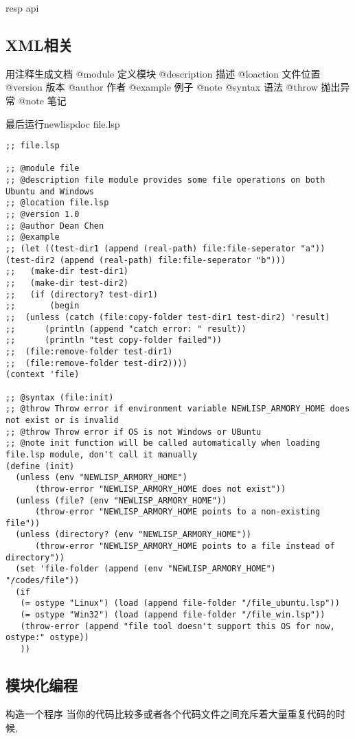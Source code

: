 \documentclass[cn,11pt]{elegantbook}
\begin{document}
resp api
 
\subsection{XML相关}

用注释生成文档
@module 定义模块
@description 描述
@loaction 文件位置
@version 版本
@author 作者
@example 例子
@note
@syntax 语法
@throw 抛出异常
@note 笔记

最后运行newlispdoc file.lsp
\begin{lstlisting}
;; file.lsp

;; @module file
;; @description file module provides some file operations on both Ubuntu and Windows
;; @location file.lsp
;; @version 1.0
;; @author Dean Chen
;; @example
;; (let ((test-dir1 (append (real-path) file:file-seperator "a")) (test-dir2 (append (real-path) file:file-seperator "b")))
;;   (make-dir test-dir1)
;;   (make-dir test-dir2)
;;   (if (directory? test-dir1)
;;       (begin
;; 	(unless (catch (file:copy-folder test-dir1 test-dir2) 'result)
;; 		(println (append "catch error: " result))
;; 		(println "test copy-folder failed"))
;; 	(file:remove-folder test-dir1)
;; 	(file:remove-folder test-dir2))))
(context 'file)

;; @syntax (file:init)
;; @throw Throw error if environment variable NEWLISP_ARMORY_HOME does not exist or is invalid
;; @throw Throw error if OS is not Windows or UBuntu
;; @note init function will be called automatically when loading file.lsp module, don't call it manually
(define (init)
  (unless (env "NEWLISP_ARMORY_HOME")
	  (throw-error "NEWLISP_ARMORY_HOME does not exist"))
  (unless (file? (env "NEWLISP_ARMORY_HOME"))
	  (throw-error "NEWLISP_ARMORY_HOME points to a non-existing file"))
  (unless (directory? (env "NEWLISP_ARMORY_HOME"))
	  (throw-error "NEWLISP_ARMORY_HOME points to a file instead of directory"))
  (set 'file-folder (append (env "NEWLISP_ARMORY_HOME") "/codes/file"))
  (if
   (= ostype "Linux") (load (append file-folder "/file_ubuntu.lsp"))
   (= ostype "Win32") (load (append file-folder "/file_win.lsp"))
   (throw-error (append "file tool doesn't support this OS for now, ostype:" ostype))
   ))
 \end{lstlisting}
 \subsection{模块化编程}

 构造一个程序 当你的代码比较多或者各个代码文件之间充斥着大量重复代码的时候,
\end{document}
